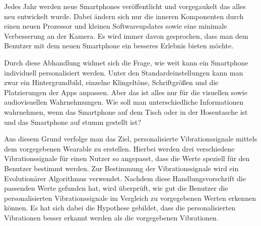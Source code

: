 
Jedes Jahr werden neue Smartphones ver{\"o}ffentlicht und vorgegaukelt das alles neu entwickelt wurde. Dabei {\"a}ndern sich nur die inneren Komponenten durch einen neuen Prozessor und kleinen Softwareupdates sowie eine minimale Verbesserung an der Kamera. 
Es wird immer davon gesprochen, dass man dem Benutzer mit dem neuen Smartphone ein besseres Erlebnis bieten m{\"o}chte. 


Durch diese Abhandlung widmet sich die Frage, wie weit kann ein Smartphone individuell personalisiert werden. 
Unter den Standardeinstellungen kann man zwar ein Hintergrundbild, einzelne Klingelt{\"o}ne, Schriftgr{\"o}{\ss}en und die Platzierungen der Apps anpassen. 
Aber das ist alles nur f{\"u}r die visuellen sowie audiovisuellen Wahrnehmungen. 
Wie soll man unterschiedliche Informationen wahrnehmen, wenn das Smartphone auf dem Tisch oder in der Hosentasche ist und das Smartphone auf stumm gestellt ist? 

Aus diesem Grund verfolge man das Ziel, personalisierte Vibrationssignale mittels dem vorgegebenen Wearable zu erstellen.
Hierbei werden drei verschiedene Vibrationssignale f{\"u}r einen Nutzer so angepasst, dass die Werte speziell f{\"u}r den Benutzer bestimmt werden. 
Zur Bestimmung der Vibrationssignale wird ein Evolution{\"a}rer Algorithmus verwendet. Nachdem diese Handlungsvorschrift die passenden Werte gefunden hat, wird {\"u}berpr{\"u}ft, wie gut die Benutzer die personalisierten Vibrationssignale im Vergleich zu vorgegebenen Werten erkennen k{\"o}nnen.
Es hat sich dabei die Hypothese gebildet, dass die personalisierten Vibrationen besser erkannt werden als die vorgegebenen Vibrationen.



